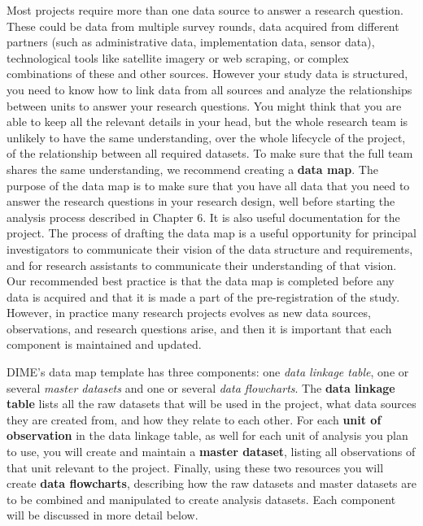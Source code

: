 Most projects require more than one data source to answer a research question.
These could be data from multiple survey rounds,
data acquired from different partners
(such as administrative data, implementation data, sensor data),
technological tools like satellite imagery or web scraping,
or complex combinations of these and other sources.
However your study data is structured,
you need to know how to link data from all sources
and analyze the relationships between units 
to answer your research questions.
You might think that you are able to keep all the relevant details in your head,
but the whole research team is unlikely to have the same understanding,
over the whole lifecycle of the project, of the relationship between all required datasets.
To make sure that the full team shares the same understanding,
we recommend creating a \textbf{data map}.
The purpose of the data map is to make sure that
you have all data that you need
to answer the research questions in your research design,
well before starting the analysis process described in Chapter 6.
It is also useful documentation for the project. 
The process of drafting the data map is a useful
opportunity for principal investigators
to communicate their vision of the data structure and requirements,
and for research assistants to communicate
their understanding of that vision.
Our recommended best practice is that
the data map is completed before any data is acquired and
that it is made a part of the pre-registration of the study.
However, in practice many research projects evolves
as new data sources, observations, and research questions arise,
and then it is important that each component is maintained and updated.

DIME's data map template has three components:
one \textit{data linkage table},
one or several \textit{master datasets}
and one or several \textit{data flowcharts}.
The \textbf{data linkage table}
lists all the raw datasets that will be used in the project,
what data sources they are created from,
and how they relate to each other.
For each \textbf{unit of observation}
in the data linkage table,
as well for each unit of analysis you plan to use,
you will create and maintain a \textbf{master dataset},
listing all observations of that unit relevant to the project.
Finally, using these two resources
you will create \textbf{data flowcharts},
describing how the raw datasets and master datasets
are to be combined and manipulated to create analysis datasets.
Each component will be discussed in more detail below. 

